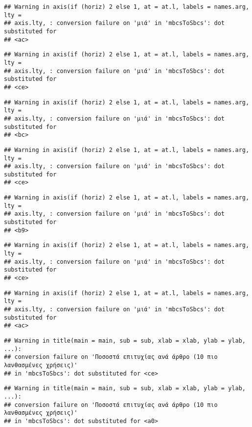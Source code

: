 \documentclass[
]{article}
\begin{document}
\begin{verbatim}
## Warning in axis(if (horiz) 2 else 1, at = at.l, labels = names.arg, lty =
## axis.lty, : conversion failure on 'μιά' in 'mbcsToSbcs': dot substituted for
## <ac>
\end{verbatim}

\begin{verbatim}
## Warning in axis(if (horiz) 2 else 1, at = at.l, labels = names.arg, lty =
## axis.lty, : conversion failure on 'μιά' in 'mbcsToSbcs': dot substituted for
## <ce>
\end{verbatim}

\begin{verbatim}
## Warning in axis(if (horiz) 2 else 1, at = at.l, labels = names.arg, lty =
## axis.lty, : conversion failure on 'μιά' in 'mbcsToSbcs': dot substituted for
## <bc>
\end{verbatim}

\begin{verbatim}
## Warning in axis(if (horiz) 2 else 1, at = at.l, labels = names.arg, lty =
## axis.lty, : conversion failure on 'μιά' in 'mbcsToSbcs': dot substituted for
## <ce>
\end{verbatim}

\begin{verbatim}
## Warning in axis(if (horiz) 2 else 1, at = at.l, labels = names.arg, lty =
## axis.lty, : conversion failure on 'μιά' in 'mbcsToSbcs': dot substituted for
## <b9>
\end{verbatim}

\begin{verbatim}
## Warning in axis(if (horiz) 2 else 1, at = at.l, labels = names.arg, lty =
## axis.lty, : conversion failure on 'μιά' in 'mbcsToSbcs': dot substituted for
## <ce>
\end{verbatim}

\begin{verbatim}
## Warning in axis(if (horiz) 2 else 1, at = at.l, labels = names.arg, lty =
## axis.lty, : conversion failure on 'μιά' in 'mbcsToSbcs': dot substituted for
## <ac>
\end{verbatim}

\begin{verbatim}
## Warning in title(main = main, sub = sub, xlab = xlab, ylab = ylab, ...):
## conversion failure on 'Ποσοστά επιτυχίας ανά άρθρο (10 πιο λανθασμένες χρήσεις)'
## in 'mbcsToSbcs': dot substituted for <ce>
\end{verbatim}

\begin{verbatim}
## Warning in title(main = main, sub = sub, xlab = xlab, ylab = ylab, ...):
## conversion failure on 'Ποσοστά επιτυχίας ανά άρθρο (10 πιο λανθασμένες χρήσεις)'
## in 'mbcsToSbcs': dot substituted for <a0>
\end{verbatim}
\end{document}
